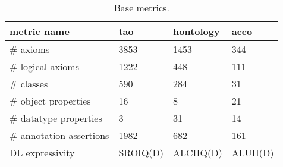 \begin{table}
\centering
\caption{Base metrics.}
\label{tab:base-metrics}
\begin{tabular}{p{3.5cm}|p{1.2cm}p{1.2cm}p{1.2cm}}
\toprule
            metric name &      tao & hontology &    acco \\
\midrule
               \# axioms &     3853 &      1453 &     344 \\
       \# logical axioms &     1222 &       448 &     111 \\
              \# classes &      590 &       284 &      31 \\
    \# object properties &       16 &         8 &      21 \\
  \# datatype properties &        3 &        31 &      14 \\
\# annotation assertions &     1982 &       682 &     161 \\
        DL expressivity & SROIQ(D) &  ALCHQ(D) & ALUH(D) \\
\bottomrule
\end{tabular}
\end{table}
